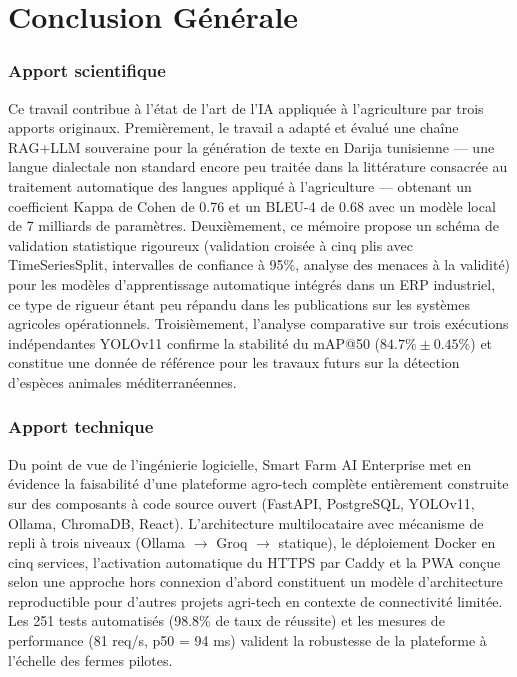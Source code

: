 \chapter*{Conclusion Générale}

\subsection*{Apport scientifique}
Ce travail contribue à l'état de l'art de l'IA appliquée à l'agriculture
par trois apports originaux. Premièrement, le travail a adapté et évalué
une chaîne RAG+LLM souveraine pour la génération de texte en Darija
tunisienne — une langue dialectale non standard encore peu traitée dans
la littérature consacrée au traitement automatique des langues appliqué à l'agriculture — obtenant un coefficient Kappa de Cohen de 0.76 et
un BLEU-4 de 0.68 avec un modèle local de 7 milliards de paramètres.
Deuxièmement, ce mémoire propose un schéma de validation statistique
rigoureux (validation croisée à cinq plis avec TimeSeriesSplit, intervalles
de confiance à 95\%, analyse des menaces à la validité) pour les modèles
d'apprentissage automatique intégrés dans un ERP industriel, ce type de rigueur étant peu répandu
dans les publications sur les systèmes agricoles opérationnels. Troisièmement,
l'analyse comparative sur trois exécutions indépendantes YOLOv11 confirme la stabilité
du mAP@50 ($84.7\% \pm 0.45\%$) et constitue une donnée de référence pour
les travaux futurs sur la détection d'espèces animales méditerranéennes.

\subsection*{Apport technique}
Du point de vue de l'ingénierie logicielle, Smart Farm AI Enterprise
met en évidence la faisabilité d'une plateforme agro-tech complète entièrement
construite sur des composants à code source ouvert (FastAPI, PostgreSQL, YOLOv11,
Ollama, ChromaDB, React). L'architecture multilocataire avec mécanisme de repli
à trois niveaux (Ollama $\rightarrow$ Groq $\rightarrow$ statique), le déploiement Docker en cinq services,
l'activation automatique du HTTPS par Caddy et la PWA conçue selon une approche hors connexion d'abord constituent un modèle
d'architecture reproductible pour d'autres projets agri-tech en contexte
de connectivité limitée. Les 251 tests automatisés (98.8\% de taux de
réussite) et les mesures de performance (81 req/s, p50 = 94 ms) valident
la robustesse de la plateforme à l'échelle des fermes pilotes.

